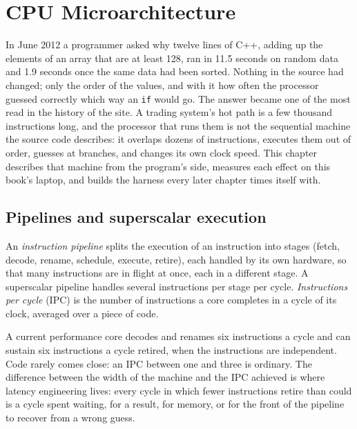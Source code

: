 \chapter{CPU Microarchitecture}\label{ch:ll:cpu-microarchitecture}

In June 2012 a programmer asked why twelve lines of C++, adding up the elements of an array that are at least 128,
ran in 11.5 seconds on random data and 1.9 seconds once the same data had been sorted. Nothing in the source had
changed; only the order of the values, and with it how often the processor guessed correctly which way an
\texttt{if} would go. The answer became one of the most read in the history of the site. A trading system's hot path
is a few thousand instructions long, and the processor that runs them is not the sequential machine the source code
describes: it overlaps dozens of instructions, executes them out of order, guesses at branches, and changes its own
clock speed. This chapter describes that machine from the program's side, measures each effect on this book's laptop,
and builds the harness every later chapter times itself with.

\section{Pipelines and superscalar execution}

\begin{definition}\label{def:ll:cpu-microarchitecture:pipeline}
An \emph{instruction pipeline} splits the execution of an instruction into stages (fetch,
decode, rename, schedule, execute, retire), each handled by its own hardware, so that many instructions are in
flight at once, each in a different stage. A superscalar pipeline handles several instructions per stage per cycle.
\emph{Instructions per cycle} (IPC) is the number of instructions a core completes in a
cycle of its clock, averaged over a piece of code.
\end{definition}

A current performance core decodes and renames six instructions a cycle and can sustain six instructions a cycle
retired, when the instructions are independent. Code rarely comes close: an IPC between one and three is ordinary.
The difference between the width of the machine and the IPC achieved is where latency engineering lives: every
cycle in which fewer instructions retire than could is a cycle spent waiting, for a result, for memory, or for the
front of the pipeline to recover from a wrong guess.


